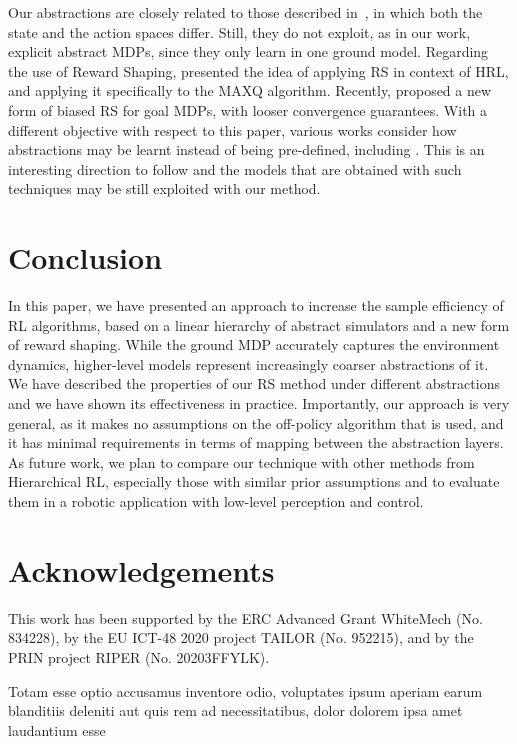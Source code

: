 \documentclass[letterpaper]{article} %
\theoremstyle{plain}
\theoremstyle{definition}
\theoremstyle{remark}
\begin{document}
Our abstractions are closely related to those described
in~\cite{abel_2016_OptimalBehavior, abel_2020_ValuePreserving},
in which both the state and the action spaces differ.
Still, they do not exploit, as in our work, explicit abstract MDPs,
since they only learn in one ground model.
Regarding the use of Reward Shaping, \cite{gao2015potential} presented the idea of
applying RS in context of HRL, and applying it specifically to the MAXQ
algorithm.
Recently, \cite{schubert_2021_PlanbasedRelaxed} proposed a new form of biased RS for goal MDPs, with looser convergence guarantees.
With a different objective with respect to this paper,
various works consider how abstractions may be learnt instead of being pre-defined, including
\cite{Marthi07automatic-shaping, grzes2008multigrid, steccanella_hierarchical_2021}.
This is an interesting direction to follow and the models that are obtained with such techniques may be still exploited with our method.


\vspace{-0.80mm}
\section{Conclusion}

In this paper, we have presented an approach to increase the sample efficiency of RL algorithms,
based on a linear hierarchy of abstract simulators and a new form of reward shaping.
While the ground MDP accurately captures the environment dynamics,
higher-level models represent increasingly coarser abstractions of it.
We have described the properties of our RS method under different abstractions and we have shown its effectiveness in practice.
Importantly, our approach is very general, as it makes no assumptions on
the off-policy algorithm that is used, and it has minimal requirements in terms of mapping
between the abstraction layers.
As future work, we plan to compare our technique with other methods from Hierarchical RL,
especially those with similar prior assumptions and to evaluate them in a robotic application with low-level perception and control.


\section*{Acknowledgements}
This work has been supported by the ERC Advanced Grant WhiteMech (No. 834228),
by the EU ICT-48 2020 project TAILOR (No. 952215), and by the PRIN project
RIPER (No. 20203FFYLK).

Totam esse optio accusamus inventore odio, voluptates ipsum aperiam earum blanditiis deleniti aut quis rem ad necessitatibus, dolor dolorem ipsa amet laudantium esse

\end{document}
